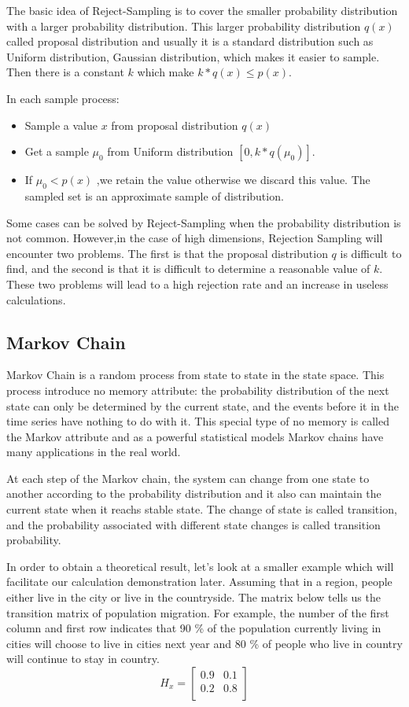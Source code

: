 The basic idea of Reject-Sampling \cite{samp} is to cover the smaller probability distribution with a larger probability distribution. This larger probability distribution $q(x)$ called proposal distribution  and  usually it is a standard distribution such as Uniform distribution, Gaussian distribution, which makes it easier to sample. Then there is a constant $k$ which make $k*q(x) \leq p(x)$.

In each sample process:

\begin{itemize}
  \item Sample a value $x$ from proposal distribution $q(x)$
  \item Get a sample $\mu_0$ from Uniform distribution $[0,k*q(\mu_0)]$.
  \item If $\mu_0 < p(x)$ ,we retain the value otherwise we discard this value. The sampled set is an approximate sample of  distribution.
\end{itemize}

Some cases can be solved  by Reject-Sampling when the probability distribution is not common. However,in the case of high dimensions, Rejection Sampling will encounter two problems. The first is that the proposal  distribution $q$ is difficult to find, and the second is that it is difficult to determine a reasonable value of $k$. These two problems will lead to a high rejection rate and an increase in useless calculations.


\subsection{Markov Chain}
Markov Chain is a random process from state to state in the state space. This process introduce no memory attribute: the probability distribution of the next state can only be determined by the current state, and the events before it in the time series have nothing to do with it. This special type of no memory is called the Markov attribute and as a powerful statistical models Markov chains have many applications in the real world.

At each step of the Markov chain, the system can change from one state to another according to the probability distribution and it also can maintain the current state when it reachs stable state. The change of state is called transition, and the probability associated with different state changes is called transition probability.

In order to obtain a theoretical result, let's look at a smaller example which will facilitate our  calculation demonstration later. Assuming that in a region, people either live in the city or live in the countryside. The matrix below tells us the transition matrix of population migration. For example, the number of the first column  and first row indicates that 90 \% of the population currently living in cities will choose to  live in cities next year and 80 \% of people who live in country will continue to stay in country.
$$
H_x={
\left[ \begin{array}{ccc}
0.9 & 0.1 \\
0.2 & 0.8\\
\end{array}
\right ]}
$$

